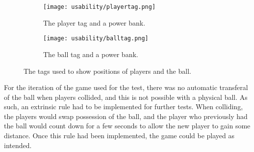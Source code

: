 \begin{figure}[H]
    \centering
    \begin{subfigure}{0.45\textwidth}
        \centering
        \texttt{[image: usability/playertag.png]}
        \caption{The player tag and a power bank.}
        \label{fig:sub1}
    \end{subfigure}
    \begin{subfigure}{0.45\textwidth}
        \centering
        \texttt{[image: usability/balltag.png]}
        \caption{The ball tag and a power bank.}
        \label{fig:sub2}
    \end{subfigure}
    \caption{The tags used to show positions of players and the ball.}
    \label{fig:two-tags}
\end{figure}
\noindent
For the iteration of the game used for the test, there was no automatic transferal of the ball when players collided, and this is not possible with a physical ball.
As such, an extrinsic rule had to be implemented for further tests.
When colliding, the players would swap possession of the ball, and the player who previously had the ball would count down for a few seconds to allow the new player to gain some distance.
Once this rule had been implemented, the game could be played as intended.

